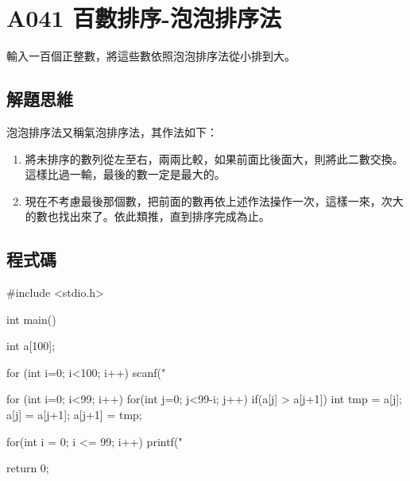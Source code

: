 \section{A041 百數排序-泡泡排序法}
輸入一百個正整數，將這些數依照泡泡排序法從小排到大。
\subsection{解題思維}

泡泡排序法又稱氣泡排序法，其作法如下：
\begin{enumerate}
	\item 將未排序的數列從左至右，兩兩比較，如果前面比後面大，則將此二數交換。這樣比過一輸，最後的數一定是最大的。
	\item 現在不考慮最後那個數，把前面的數再依上述作法操作一次，這樣一來，次大的數也找出來了。依此類推，直到排序完成為止。
\end{enumerate} 

\subsection{程式碼}
\begin{cppcode}
	#include <stdio.h>
	
	int main()
	{
		int a[100];
		
		for (int i=0; i<100; i++) scanf("%

		for (int i=0; i<99; i++) {
			for(int j=0; j<99-i; j++) {
				if(a[j] > a[j+1]) {
					int tmp = a[j];
					a[j] = a[j+1];
					a[j+1] = tmp;
				}
			}
		}
		
		for(int i = 0; i <= 99; i++) printf("%
		
		return 0;
	}
\end{cppcode}
